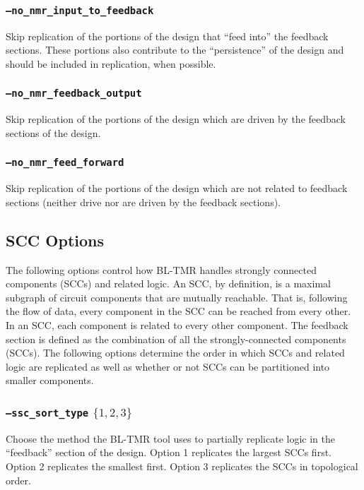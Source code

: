 \subsubsection{\texttt{--no\_nmr\_input\_to\_feedback}}
Skip replication of the portions of the design that ``feed into'' the feedback 
sections. These portions also contribute to the ``persistence'' of the design 
and should be included in replication, when possible.

\subsubsection{\texttt{--no\_nmr\_feedback\_output}}
Skip replication of the portions of the design which are driven by the 
feedback sections of the design.

\subsubsection{\texttt{--no\_nmr\_feed\_forward}}
Skip replication of the portions of the design which are not related to 
feedback sections (neither drive nor are driven by the feedback sections).

\subsection{SCC Options}
The following options control how BL-TMR handles strongly connected components 
(SCCs) and related logic. An SCC, by definition, is a maximal subgraph of
circuit components that are mutually reachable. That is, following the flow of
data, every component in the SCC can be reached from every other. In an SCC,
each component is related to every other component. The feedback section is
defined as the combination of all the strongly-connected components (SCCs). The
following options determine the order in which SCCs and related logic are
replicated as well as whether or not SCCs can be partitioned into smaller
components.

\subsubsection{\texttt{--ssc\_sort\_type} $\{1,2,3\}$}
Choose the method the BL-TMR tool uses to partially replicate logic in the 
``feedback'' section of the design.  Option 1 replicates the largest SCCs 
first. Option 2 replicates the smallest first. Option 3 replicates the SCCs 
in topological order.

